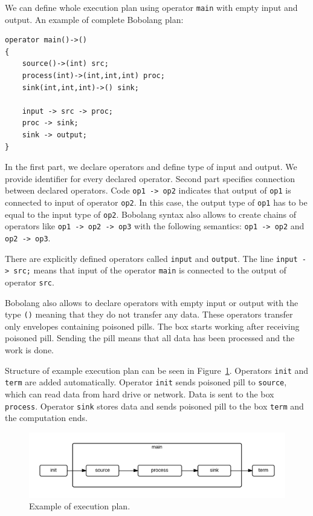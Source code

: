 We can define whole execution plan using operator \verb|main| with empty input and output. An example of complete Bobolang plan:

\begin{verbatim}
operator main()->()
{
    source()->(int) src;
    process(int)->(int,int,int) proc;
    sink(int,int,int)->() sink;

    input -> src -> proc; 
    proc -> sink;
    sink -> output;
}
\end{verbatim}

In the first part, we declare operators and define type of input and output. We provide identifier for every declared operator. Second part specifies connection between declared operators. Code \verb|op1 -> op2| indicates that output of \verb|op1| is connected to input of operator \verb|op2|. In this case, the output type of \verb|op1| has to be equal to the input type of \verb|op2|. Bobolang syntax also allows to create chains of operators like \verb|op1 -> op2 -> op3| with the following semantics: \verb|op1 -> op2| and \verb|op2 -> op3|. 

There are explicitly defined operators called \verb|input| and \verb|output|. The line \verb|input -> src;| means that input of the operator \verb|main| is connected to the output of operator \verb|src|.

Bobolang also allows to declare operators with empty input or output with the type \verb|()| meaning that they do not transfer any data. These operators transfer only envelopes containing poisoned pills. The box starts working after receiving poisoned pill. Sending the pill means that all data has been processed and the work is done.


 Structure of example execution plan can be seen in Figure~\ref{fig:exampleplan}. Operators \verb|init| and \verb|term| are added automatically. Operator \verb|init| sends poisoned pill to \verb|source|, which can read data from hard drive or network. Data is sent to the box \verb|process|. Operator \verb|sink| stores data and sends poisoned pill to the box \verb|term| and the computation ends.
\begin{figure}[h!]
  \centering

    \includegraphics[width=1\textwidth]{exampleplan}
    
      \caption{Example of execution plan.}
        \label{fig:exampleplan}
\end{figure}




